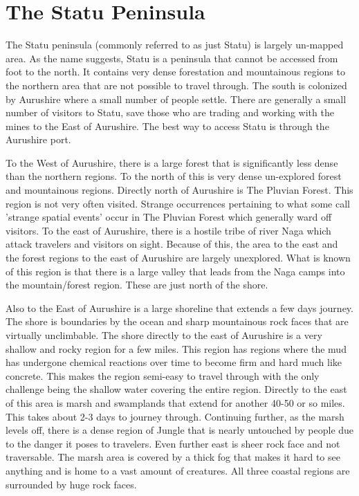 \section{The Statu Peninsula}

The Statu peninsula (commonly referred to as just Statu) is largely un-mapped area. As the name suggests, Statu is a peninsula that cannot be accessed from foot to the north. It contains very dense forestation and mountainous regions to the northern area that are not possible to travel through. The south is colonized by Aurushire where a small number of people settle. There are generally a small number of visitors to Statu, save those who are trading and working with the mines to the East of Aurushire. The best way to access Statu is through the Aurushire port.

To the West of Aurushire, there is a large forest that is significantly less dense than the northern regions. To the north of this is very dense un-explored forest and mountainous regions. Directly north of Aurushire is The Pluvian Forest. This region is not very often visited. Strange occurrences pertaining to what some call 'strange spatial events' occur in The Pluvian Forest which generally ward off visitors. To the east of Aurushire, there is a hostile tribe of river Naga which attack travelers and visitors on sight. Because of this, the area to the east and the forest regions to the east of Aurushire are largely unexplored. What is known of this region is that there is a large valley that leads from the Naga camps into the mountain/forest region. These are just north of the shore.

Also to the East of Aurushire is a large shoreline that extends a few days journey. The shore is boundaries by the ocean and sharp mountainous rock faces that are virtually unclimbable. The shore directly to the east of Aurushire is a very shallow and rocky region for a few miles. This region has regions where the mud has undergone chemical reactions over time to become firm and hard much like concrete. This makes the region semi-easy to travel through with the only challenge being the shallow water covering the entire region. Directly to the east of this area is marsh and swamplands that extend for another 40-50 or so miles. This takes about 2-3 days to journey through. Continuing further, as the marsh levels off, there is a dense region of Jungle that is nearly untouched by people due to the danger it poses to travelers. Even further east is sheer rock face and not traversable. The marsh area is covered by a thick fog that makes it hard to see anything and is home to a vast amount of creatures. All three coastal regions are surrounded by huge rock faces.